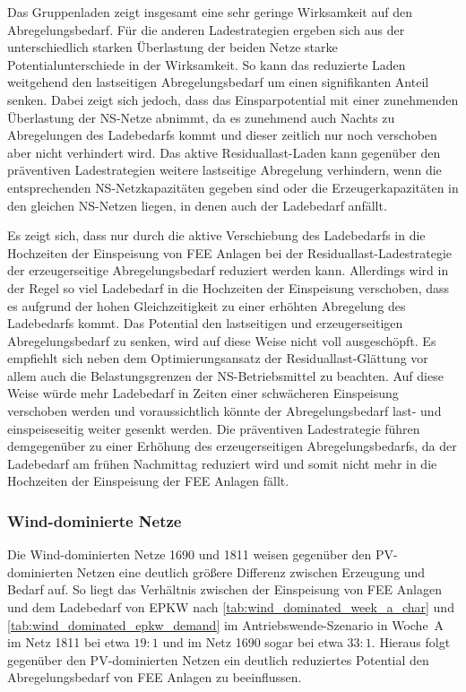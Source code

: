 Das Gruppenladen zeigt insgesamt eine sehr geringe Wirksamkeit auf den Abregelungsbedarf.
Für die anderen Ladestrategien ergeben sich aus der unterschiedlich starken Überlastung der beiden Netze starke Potentialunterschiede in der Wirksamkeit.
So kann das reduzierte Laden weitgehend den lastseitigen Abregelungsbedarf um einen signifikanten Anteil senken.
Dabei zeigt sich jedoch, dass das Einsparpotential mit einer zunehmenden Überlastung der \gls{NS}-Netze abnimmt, da es zunehmend auch Nachts zu Abregelungen des Ladebedarfs kommt und dieser zeitlich nur noch verschoben aber nicht verhindert wird.
Das aktive Residuallast-Laden kann gegenüber den präventiven Ladestrategien weitere lastseitige Abregelung verhindern, wenn die entsprechenden \gls{NS}-Netzkapazitäten gegeben sind oder die Erzeugerkapazitäten in den gleichen \gls{NS}-Netzen liegen, in denen auch der Ladebedarf anfällt.\medskip

Es zeigt sich, dass nur durch die aktive Verschiebung des Ladebedarfs in die Hochzeiten der Einspeisung von \gls{FEE} Anlagen bei der Residuallast-Ladestrategie der erzeugerseitige Abregelungsbedarf reduziert werden kann.
Allerdings wird in der Regel so viel Ladebedarf in die Hochzeiten der Einspeisung verschoben, dass es aufgrund der hohen Gleichzeitigkeit zu einer erhöhten Abregelung des Ladebedarfs kommt.
Das Potential den lastseitigen und erzeugerseitigen Abregelungsbedarf zu senken, wird auf diese Weise nicht voll ausgeschöpft.
Es empfiehlt sich neben dem Optimierungsansatz der Residuallast-Glättung vor allem auch die Belastungsgrenzen der \gls{NS}-Betriebsmittel zu beachten.
Auf diese Weise würde mehr Ladebedarf in Zeiten einer schwächeren Einspeisung verschoben werden und voraussichtlich könnte der Abregelungsbedarf last- und einspeiseseitig weiter gesenkt werden.
Die präventiven Ladestrategie führen demgegenüber zu einer Erhöhung des erzeugerseitigen Abregelungsbedarfs, da der Ladebedarf am frühen Nachmittag reduziert wird und somit nicht mehr in die Hochzeiten der Einspeisung der \gls{FEE} Anlagen fällt.


\subsubsection{Wind-dominierte Netze}

Die Wind-dominierten Netze \num{1690} und \num{1811} weisen gegenüber den \gls{PV}-dominierten Netzen eine deutlich größere Differenz zwischen Erzeugung und Bedarf auf.
So liegt das Verhältnis zwischen der Einspeisung von \gls{FEE} Anlagen und dem Ladebedarf von \gls{EPKW} nach \autoref{tab:wind_dominated_week_a_char} und \autoref{tab:wind_dominated_epkw_demand} im Antriebswende-Szenario in Woche~A im Netz \num{1811} bei etwa \(19:1\) und im Netz \num{1690} sogar bei etwa \(33:1\).
Hieraus folgt gegenüber den \gls{PV}-dominierten Netzen ein deutlich reduziertes Potential den Abregelungsbedarf von \gls{FEE} Anlagen zu beeinflussen.


